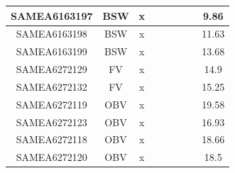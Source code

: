 \documentclass[../main.tex]{subfiles}
\begin{document}
\begin{flushleft}
\begin{footnotesize}
\begin{longtable}{|c|c|c|c|c|c|c|}
    \hline
    SAMEA6163197  & BSW   & x                                                            & ~          & ~                                                                           & ~                                                                 & 9.86      \\ 
    \hline
    SAMEA6163198  & BSW   & x                                                            & ~          & ~                                                                           & ~                                                                 & 11.63     \\ 
    \hline
    SAMEA6163199  & BSW   & x                                                            & ~          & ~                                                                           & ~                                                                 & 13.68     \\ 
    \hline
    SAMEA6272129  & FV    & x                                                            & ~          & ~                                                                           & ~                                                                 & 14.9      \\ 
    \hline
    SAMEA6272132  & FV    & x                                                            & ~          & ~                                                                           & ~                                                                 & 15.25     \\ 
    \hline
    SAMEA6272119  & OBV   & x                                                            & ~          & ~                                                                           & ~                                                                 & 19.58     \\ 
    \hline
    SAMEA6272123  & OBV   & x                                                            & ~          & ~                                                                           & ~                                                                 & 16.93     \\ 
    \hline
    SAMEA6272118  & OBV   & x                                                            & ~          & ~                                                                           & ~                                                                 & 18.66     \\ 
    \hline
    SAMEA6272120  & OBV   & x                                                            & ~          & ~                                                                           & ~                                                                 & 18.5      \\ 

\end{longtable}
\end{footnotesize}
\end{flushleft}
\end{document}
